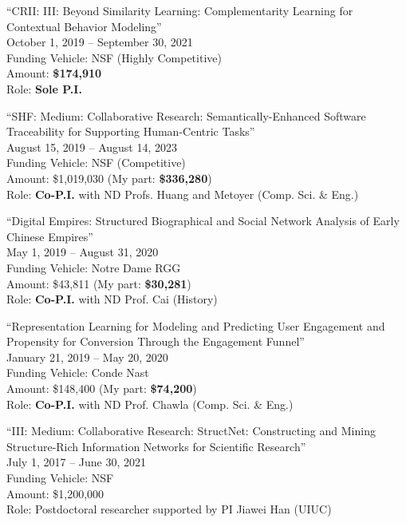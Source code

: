 \documentclass[10pt]{article}
\newenvironment{myindentpar}[1]%
{\begin{list}{}%
         {\setlength{\leftmargin}{#1}}%
         \item[]%
}
{\end{list}}
\newcounter{list}
\begin{document}
\begin{myindentpar}{0.75cm}

\hspace{-0.75cm}``CRII: III: Beyond Similarity Learning: Complementarity Learning for Contextual Behavior Modeling''\\
October 1, 2019 -- September 30, 2021 \\
Funding Vehicle: NSF (Highly Competitive) \\
Amount: \textbf{\$174,910} \\
Role: \textbf{Sole P.I.}

\hspace{-0.75cm}``SHF: Medium: Collaborative Research: Semantically-Enhanced Software Traceability for Supporting Human-Centric Tasks''\\
August 15, 2019 -- August 14, 2023 \\
Funding Vehicle: NSF (Competitive) \\
Amount: \$1,019,030 (My part: \textbf{\$336,280}) \\
Role: \textbf{Co-P.I.} with ND Profs. Huang and Metoyer (Comp. Sci. \& Eng.)

\hspace{-0.75cm}``Digital Empires: Structured Biographical and Social Network Analysis of Early Chinese Empires''\\
May 1, 2019 -- August 31, 2020 \\
Funding Vehicle: Notre Dame RGG \\
Amount: \$43,811 (My part: \textbf{\$30,281}) \\
Role: \textbf{Co-P.I.} with ND Prof. Cai (History)

\hspace{-0.75cm}``Representation Learning for Modeling and Predicting User Engagement and Propensity for Conversion Through the Engagement Funnel''\\
January 21, 2019 -- May 20, 2020 \\
Funding Vehicle: Conde Nast \\
Amount: \$148,400 (My part: \textbf{\$74,200}) \\
Role: \textbf{Co-P.I.} with ND Prof. Chawla (Comp. Sci. \& Eng.)

\hspace{-0.75cm}``III: Medium: Collaborative Research: StructNet: Constructing and Mining Structure-Rich Information Networks for Scientific Research''\\
July 1, 2017 -- June 30, 2021 \\
Funding Vehicle: NSF \\
Amount: \$1,200,000 \\
Role: Postdoctoral researcher supported by PI Jiawei Han (UIUC)


\end{myindentpar}
\end{document}
